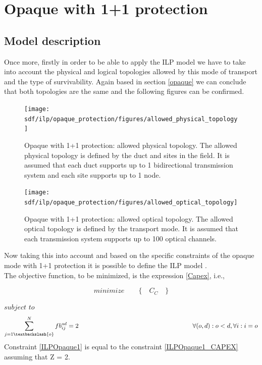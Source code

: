 \clearpage

\section{Opaque with 1+1 protection}\label{ILP_Opaque_Protection}

\subsection{Model description}

Once more, firstly in order to be able to apply the ILP model we have to take into account the physical and logical topologies allowed by this mode of transport and the type of survivability. Again based in section \ref{opaque} we can conclude that both topologies are the same and the following figures can be confirmed.\\

\begin{figure}[h!]
\centering
\texttt{[image: sdf/ilp/opaque\_protection/figures/allowed\_physical\_topology]}
\caption{Opaque with 1+1 protection: allowed physical topology. The allowed physical topology is defined by the duct and sites in the field. It is assumed that each duct supports up to 1 bidirectional transmission system and each site supports up to 1 node.}
\label{allowed_physical_protectionlow}
\end{figure}

\vspace{13pt}
\begin{figure}[h!]
\centering
\texttt{[image: sdf/ilp/opaque\_protection/figures/allowed\_optical\_topology]}
\caption{Opaque with 1+1 protection: allowed optical topology. The allowed optical topology is defined by the transport mode. It is assumed that each transmission system supports up to 100 optical channels.}
\label{allowed_optical_protectionlow}
\end{figure}

Now taking this into account and based on the specific constraints of the opaque mode with 1+1 protection it is possible to define the ILP model \cite{tesevasco}.\\
\newpage
The objective function, to be minimized, is the expression \ref{Capex}, i.e.,

\begin{equation*}
  minimize \qquad \Big\{ \quad C_C \quad \Big\}
\end{equation*}

$subject$ $to$
\begin{equation}
\sum_{j=1\textbackslash \{o\}}^{N} fb_{ij}^{od} = 2  \qquad \qquad \qquad \qquad \qquad \qquad \qquad \qquad \qquad
\forall(o,d) : o < d, \forall i: i = o
\label{ILPOpaque1}
\end{equation}
\noindent
Constraint \ref{ILPOpaque1} is equal to the constraint \ref{ILPOpaque1_CAPEX} assuming that Z = 2.

